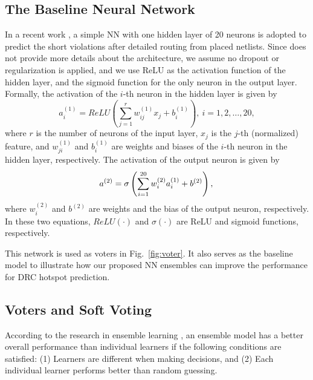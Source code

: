 \documentclass[10pt, final, letter, twocolumns]{IEEEtran}
\begin{document}
\subsection{The Baseline Neural Network}\vspace{-1mm}
\label{subsec:baseline}
In a recent work \cite{DAC18}, a simple NN with one hidden layer of 20 neurons is adopted to predict the short violations after detailed routing from placed netlists. Since \cite{DAC18} does not provide more details about the architecture, we assume no dropout or regularization is applied, and we use ReLU as the activation function of the hidden layer, and the sigmoid function for the only neuron in the output layer. Formally, the activation of the $i$-th neuron in the hidden layer is given by
\vspace{-2mm}
\begin{equation}
a_{i}^{(1)}=ReLU\left(\sum_{j=1}^r w_{ij}^{(1)}x_{j}+b_{i}^{(1)}\right),~i=1,2,\dots,20,
\label{eqn:hidden}
\end{equation}
where $r$ is the number of neurons of the input layer, $x_{j}$ is the $j$-th (normalized) feature, and $w_{ji}^{(1)}$ and $b_{i}^{(1)}$ are weights and biases of the $i$-th neuron in the hidden layer, respectively.
The activation of the output neuron is given by
\vspace{-2mm}\begin{equation}
a^{(2)}=\sigma\left(\sum_{i=1}^{20} w_{i}^{(2)}a_{i}^{(1)}+b^{(2)}\right),\\
\end{equation}
where $w_{i}^{(2)}$ and $b^{(2)}$ are weights and the bias of the output neuron, respectively. In these two equations,
$ReLU(\cdot)$ and $\sigma(\cdot)$ are ReLU and sigmoid functions, respectively.

This network is used as voters in Fig.~\ref{fig:voter}. It also serves as the baseline model to illustrate how our proposed NN ensembles can improve the performance for DRC hotspot prediction.

\vspace{-1mm}
\subsection{Voters and Soft Voting}\vspace{-1mm}
\label{subsec:soft-voting}
According to the research in ensemble learning \cite{NNE90, NNE95}, an ensemble model has a better overall performance than individual learners if the following conditions are satisfied: (1) Learners are different when making decisions, and
(2) Each individual learner performs better than random guessing. 
\end{document}
